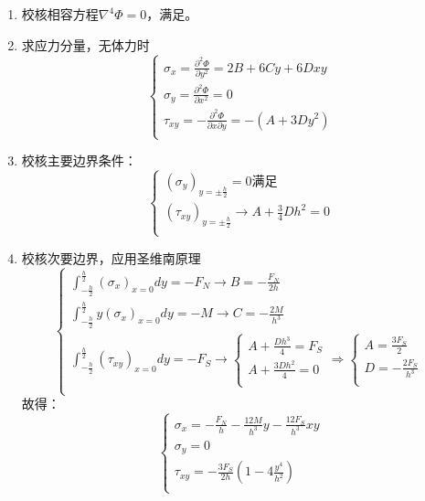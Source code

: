 \begin{remark}
\begin{enumerate}
	\quad
	\item 校核相容方程$\nabla ^4\varPhi =0$，满足。
	\item 求应力分量，无体力时\[\begin{cases}
	\sigma _x=\frac{\partial ^2\varPhi}{\partial y^2}=2B+6Cy+6Dxy\\
	\sigma _y=\frac{\partial ^2\varPhi}{\partial x^2}=0\\
	\tau _{xy}=-\frac{\partial ^2\varPhi}{\partial x\partial y}=-\left( A+3Dy^2 \right)\\
	\end{cases}\]
	\item 校核主要边界条件：\[\begin{cases}
	\left( \sigma _y \right) _{y=\pm \frac{h}{2}}=0 \text{满足}\\
	\left( \tau _{xy} \right) _{y=\pm \frac{h}{2}}\rightarrow A+\frac{3}{4}Dh^2=0\\
	\end{cases}\]
	\item 校核次要边界，应用圣维南原理\[\begin{cases}
	\int_{-\frac{h}{2}}^{\frac{h}{2}}{\left( \sigma _x \right) _{x=0}dy}=-F_N\rightarrow B=-\frac{F_N}{2h}\\
	\int_{-\frac{h}{2}}^{\frac{h}{2}}{y\left( \sigma _x \right) _{x=0}dy}=-M\rightarrow C=-\frac{2M}{h^3}\\
	\int_{-\frac{h}{2}}^{\frac{h}{2}}{\left( \tau _{xy} \right) _{x=0}dy}=-F_S\rightarrow \begin{cases}
	A+\frac{Dh^3}{4}=F_S\\
	A+\frac{3Dh^2}{4}=0\\
	\end{cases}\Longrightarrow \begin{cases}
	A=\frac{3F_S}{2}\\
	D=-\frac{2F_S}{h^3}\\
	\end{cases}\\
	\end{cases}\]
	故得：\[\begin{cases}
	\sigma _x=-\frac{F_N}{h}-\frac{12M}{h^3}y-\frac{12F_S}{h^3}xy\\
	\sigma _y=0\\
	\tau _{xy}=-\frac{3F_S}{2h}\left( 1-4\frac{y^4}{h^2} \right)\\
	\end{cases}\]
\end{enumerate}
\end{remark}
